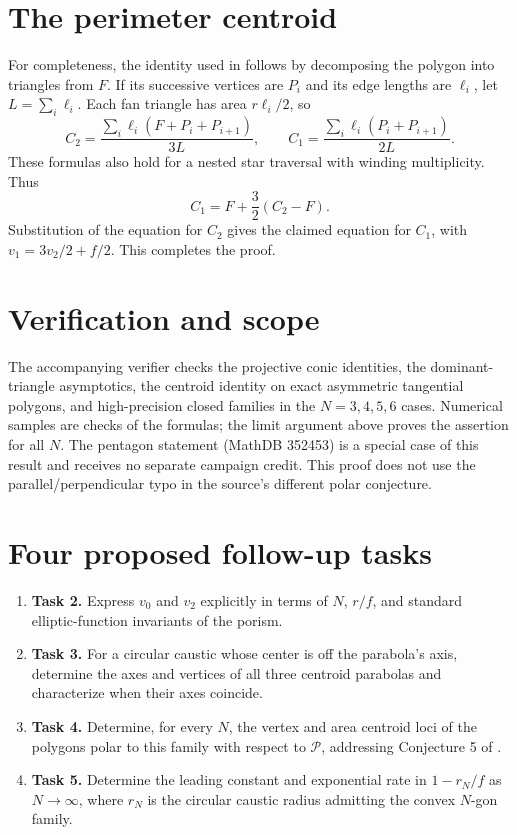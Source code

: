 \documentclass[11pt]{article}
\begin{document}
\section*{The perimeter centroid}
For completeness, the identity used in \cite[Remark 1]{BGR} follows
by decomposing the polygon into triangles from $F$. If its successive
vertices are $P_i$ and its edge lengths are $\ell_i$, let
$L=\sum_i\ell_i$. Each fan triangle has area $r\ell_i/2$, so
\[
 C_2=\frac{\sum_i\ell_i(F+P_i+P_{i+1})}{3L},
 \qquad
 C_1=\frac{\sum_i\ell_i(P_i+P_{i+1})}{2L}.
\]
These formulas also hold for a nested star traversal with winding
multiplicity. Thus
\[
 C_1=F+\frac32(C_2-F).
\]
Substitution of the equation for $C_2$ gives the claimed equation for
$C_1$, with $v_1=3v_2/2+f/2$. This completes the proof.

\section*{Verification and scope}
The accompanying verifier checks the projective conic identities,
the dominant-triangle asymptotics, the centroid identity on exact
asymmetric tangential polygons, and high-precision closed families
in the $N=3,4,5,6$ cases. Numerical samples are checks of the formulas;
the limit argument above proves the assertion for all $N$.
The pentagon statement (MathDB 352453) is a special case of this result
and receives no separate campaign credit. This proof does not use the
parallel/perpendicular typo in the source's different polar conjecture.

\section*{Four proposed follow-up tasks}
\begin{enumerate}
 \item \textbf{Task 2.} Express $v_0$ and $v_2$ explicitly in terms of
 $N$, $r/f$, and standard elliptic-function invariants of the porism.
 \item \textbf{Task 3.} For a circular caustic whose center is off the
 parabola's axis, determine the axes and vertices of all three centroid
 parabolas and characterize when their axes coincide.
 \item \textbf{Task 4.} Determine, for every $N$, the vertex and area
 centroid loci of the polygons polar to this family with respect to
 $\mathcal P$, addressing Conjecture 5 of \cite{BGR}.
 \item \textbf{Task 5.} Determine the leading constant and exponential
 rate in $1-r_N/f$ as $N\to\infty$, where $r_N$ is the circular
 caustic radius admitting the convex $N$-gon family.
\end{enumerate}
\end{document}

